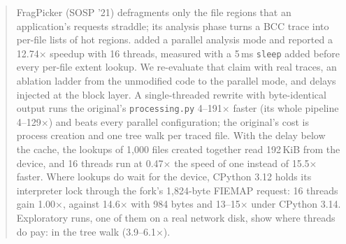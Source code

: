 \begin{abstract}
FragPicker (SOSP '21) defragments only the file regions that an application's requests
straddle; its analysis phase turns a BCC trace into per-file lists of hot regions.
\forkowner{} added a parallel analysis mode and reported a 12.74$\times$ speedup with 16
threads, measured with a 5\,ms \texttt{sleep} added before every per-file extent lookup.
We re-evaluate that claim with real traces, an ablation ladder from the unmodified code
to the parallel mode, and delays injected at the block layer. A single-threaded rewrite
with byte-identical output runs the original's \texttt{processing.py} 4--191$\times$
faster (its whole pipeline 4--129$\times$) and beats every parallel configuration; the
original's cost is process creation and one tree walk per traced file. With the delay below the cache, the lookups of 1{,}000 files created
together read 192\,KiB from the device, and 16 threads run at 0.47$\times$ the speed of
one instead of 15.5$\times$ faster. Where lookups do wait for the device, CPython 3.12
holds its interpreter lock through the fork's 1{,}824-byte FIEMAP request: 16 threads
gain 1.00$\times$, against 14.6$\times$ with 984 bytes and 13--15$\times$ under CPython
3.14. Exploratory runs, one of them on a real network disk, show where threads do pay:
in the tree walk (3.9--6.1$\times$).
\end{abstract}
